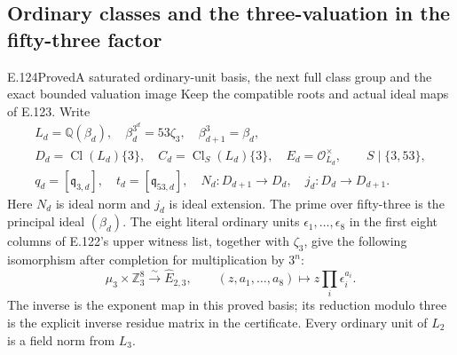 \subsection{Ordinary classes and the three-valuation in the fifty-three factor}

\begin{statement}{E.124}{Proved}{A saturated ordinary-unit basis, the next full class group and the exact bounded valuation image}
Keep the compatible roots and actual ideal maps of E.123. Write
\[
 \begin{gathered}
 L_d=\mathbb Q(\beta_d),\quad
 \beta_d^{3^d}=53\zeta_3,\quad \beta_{d+1}^3=\beta_d,\\
 D_d=\operatorname{Cl}(L_d)\{3\},\quad
 C_d=\operatorname{Cl}_S(L_d)\{3\},\quad
 E_d=\mathcal O_{L_d}^{\times},\qquad S\mid\{3,53\},\\
 q_d=[\mathfrak q_{3,d}],\quad t_d=[\mathfrak q_{53,d}],\quad
 N_d:D_{d+1}\longrightarrow D_d,\quad
 j_d:D_d\longrightarrow D_{d+1}.
 \end{gathered}
 \tag{E124.1}
\]
Here $N_d$ is ideal norm and $j_d$ is ideal extension. The prime
over fifty-three is the principal ideal $(\beta_d)$.
The eight literal ordinary units $\epsilon_1,\ldots,\epsilon_8$
in the first eight columns of E.122's upper witness list, together
with $\zeta_3$, give the following isomorphism after completion
for multiplication by $3^n$:
\[
 \mu_3\times\mathbb Z_3^8\xrightarrow{\sim}\widehat E_{2,3},
 \qquad (z,a_1,\ldots,a_8)\longmapsto z\prod_i\epsilon_i^{a_i}.
 \tag{E124.2}
\]
The inverse is the exponent map in this proved basis; its reduction
modulo three is the explicit inverse residue matrix in the certificate.
Every ordinary unit of $L_2$ is a field norm from $L_3$.


\end{statement}
